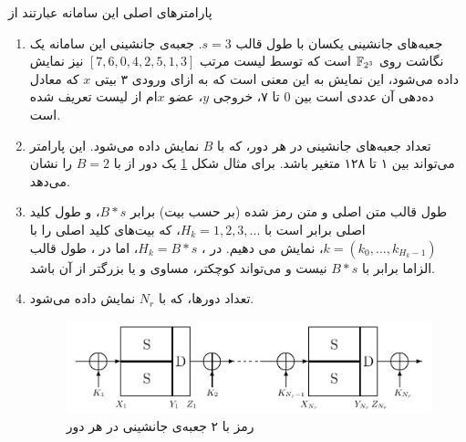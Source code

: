 پارامترهای اصلی این سامانه عبارتند از 
\begin{enumerate}
	\item 
	جعبه‌های جانشینی یکسان با طول قالب 
	$s = 3$.
	جعبه‌ی جانشینی این سامانه یک نگاشت روی 
	$\mathbb{F}_{2^{3}}$
	است که توسط لیست مرتب 
	$[7,6,0,4,2,5,1,3]$
	نیز نمایش داده می‌شود، این نمایش به این معنی است که به ازای ورودی ۳ بیتی 
	$x$
	که معادل  ده‌دهی آن عددی است بین 
	$0$
	تا ۷، خروجی  
	$y$،
	 عضو 
	$x$ام
	 از لیست تعریف شده است. 
	\item 
	تعداد جعبه‌های جانشینی در هر دور، که با 
	$B$
	نمایش داده می‌شود. این پارامتر می‌تواند بین ۱ تا ۱۲۸ متغیر باشد. برای مثال شکل 
	\ref{fig:ctc2}
	یک دور از 
	با 
	$B = 2$
	را نشان می‌دهد. 
	\item 
 طول قالب متن اصلی و  متن رمز شده (بر حسب بیت) برابر 
 $B*s$، 
و طول کلید اصلی برابر است با
$H_{k} = 1,2,3,...$، 
که بیت‌های کلید اصلی را با 
$k = (k_{0},...,k_{H_{k} - 1})$، 
نمایش می‌ دهیم. در 
،  
$H_{k} = B*s$، 
اما در 
، 
طول قالب الزاما برابر با  
$B*s$
نیست و می‌تواند کوچکتر، مساوی و یا بزرگتر از آن باشد. 
	\item 
	تعداد دورها، که با 
	$N_{r}$
	نمایش داده می‌شود.
	\begin{figure}
		\centering
		\includegraphics[width=0.7\linewidth]{Images/CTC_2}
		\caption{رمز
			با ۲ جعبه‌ی جانشینی در هر دور}
		\label{fig:ctc2}
	\end{figure}
\end{enumerate}


